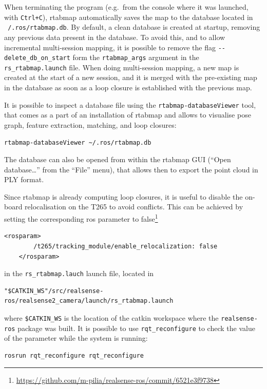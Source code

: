 \documentclass[11pt, letterpaper, twoside]{article}
\begin{document}
When terminating the program (e.g.\ from the console where it was launched, with
\texttt{Ctrl+C}), \gls{rtabmap} automatically saves the map to the database
located in \texttt{~/.ros/rtabmap.db}. By default, a clean database is created
at startup, removing any previous data present in the database. To avoid this,
and to allow incremental multi-session mapping, it is possible to remove the
flag \texttt{-{}-delete\_db\_on\_start} form the \texttt{rtabmap\_args} argument
in the \texttt{rs\_rtabmap.launch} file. When doing multi-session mapping, a
new map is created at the start of a new session, and it is merged with
the pre-existing map in the database as soon as a loop closure is established
with the previous map.

It is possible to inspect a database file using the
\texttt{rtabmap-databaseViewer} tool, that comes as a part of an installation
of \gls{rtabmap} and allows to visualise pose graph, feature extraction,
matching, and loop closures:
\begin{Verbatim}[samepage=true]
    rtabmap-databaseViewer ~/.ros/rtabmap.db
\end{Verbatim}
The database can also be opened from within the \gls{rtabmap} GUI (``Open
database\ldots'' from the ``File'' menu), that allows then to export the point
cloud in PLY format.

Since \gls{rtabmap} is already computing loop closures, it is useful to disable
the on-board relocalisation on the T265 to avoid conflicts. This can be
achieved by setting the corresponding \gls{ros} parameter to
false\footnote{\url{https://github.com/m-pilia/realsense-ros/commit/6521e3f9738}}
\begin{Verbatim}[samepage=true]
    <rosparam>
        /t265/tracking_module/enable_relocalization: false
    </rosparam>
\end{Verbatim}
in the \texttt{rs\_rtabmap.lauch} launch file, located in
\begin{Verbatim}[samepage=true]
    "$CATKIN_WS"/src/realsense-ros/realsense2_camera/launch/rs_rtabmap.launch
\end{Verbatim}
where \texttt{\$CATKIN\_WS} is the location of the catkin workspace where the
\texttt{realsense-ros} package was built. It is possible to use
\texttt{rqt\_reconfigure} to check the value of the parameter while the system
is running:
\begin{Verbatim}[samepage=true]
    rosrun rqt_reconfigure rqt_reconfigure
\end{Verbatim}
\end{document}
